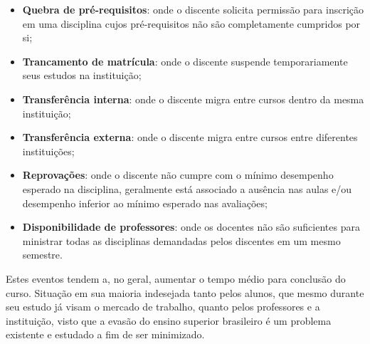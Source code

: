 \begin{itemize}
    \item \textbf{Quebra de pré-requisitos}: onde o discente solicita permissão para inscrição em uma disciplina cujos pré-requisitos não são completamente cumpridos por si;
    \item \textbf{Trancamento de matrícula}: onde o discente suspende temporariamente seus estudos na instituição;
    \item \textbf{Transferência interna}: onde o discente migra entre cursos dentro da mesma instituição;
    \item \textbf{Transferência externa}: onde o discente migra entre cursos entre diferentes instituições;
    \item \textbf{Reprovações}: onde o discente não cumpre com o mínimo desempenho esperado na disciplina, geralmente está associado a ausência nas aulas e/ou desempenho inferior ao mínimo esperado nas avaliações;
    \item \textbf{Disponibilidade de professores}: onde os docentes não são suficientes para ministrar todas as disciplinas demandadas pelos discentes em um mesmo semestre.
\end{itemize}


Estes eventos tendem a, no geral, aumentar o tempo médio para conclusão do curso. Situação em sua maioria indesejada tanto pelos alunos, que mesmo durante seu estudo já visam o mercado de trabalho, quanto pelos professores e a instituição, visto que a evasão do ensino superior brasileiro é um problema existente e estudado a fim de ser minimizado.


